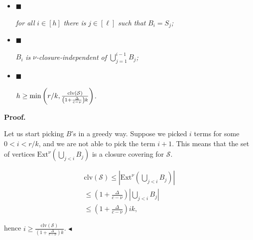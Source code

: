 \begin{itemize}


\item[] 
$\blacksquare$ 


\emph{for all }$i\in[h]$\emph{ there is }$j\in[\ell]$\emph{ such that }$B_{i}=S_{j}$\emph{;}\par





\item[] 
$\blacksquare$ 


$B_{i}$\emph{ is }$\nu$\emph{-closure-independent of }$\bigcup\limits_{j=1}^{i-1}B_{j}$\emph{;}\par





\item[] 
$\blacksquare$ 


$h\geq\min\left(r/k,\frac{\mathrm{clv}\left(\mathcal{S}\right)}{\left(1+\frac{%
\Delta}{c-\nu}\right)k}\right)$\emph{.}\par





\end{itemize}






\par\medskip\noindent\textbf{Proof.}\par




Let us start picking $B$’s in a greedy way. Suppose we picked $i$
terms for some $0<i<r/k$, and we are not able to pick the
term $i+1$. This means that the set of vertices
$\mathrm{Ext}^{\nu}\left(\bigcup\limits_{j<i}B_{j}\right)$ is a closure covering
for $\mathcal{S}$.\par


\[\begin{gathered}
\displaystyle\mathrm{clv}\left(\mathcal{S}\right) \displaystyle\leq|\mathrm{Ext}^{\nu}\left(\bigcup\limits_{j<i}B_{j}\right)| \\
\displaystyle\leq\left(1+\frac{\Delta}{c-\nu}\right)|\bigcup\limits_{j<i}B_{j}| \\
\displaystyle\leq\left(1+\frac{\Delta}{c-\nu}\right)ik,
\end{gathered}\]


hence $i\geq\frac{\mathrm{clv}\left(\mathcal{S}\right)}{\left(1+\frac{\Delta}{c-\nu}%
\right)k}$.
$\blacktriangleleft$\par






